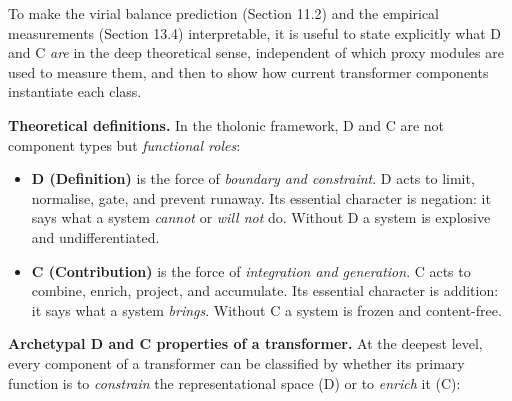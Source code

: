 \documentclass[12pt]{article}
\providecommand{\tightlist}{%
  \setlength{\itemsep}{0pt}\setlength{\parskip}{0pt}}
\begin{document}
To make the virial balance prediction (Section 11.2) and the empirical
measurements (Section 13.4) interpretable, it is useful to state
explicitly what D and C \emph{are} in the deep theoretical sense,
independent of which proxy modules are used to measure them, and then to
show how current transformer components instantiate each class.

\textbf{Theoretical definitions.} In the tholonic framework, D and C are
not component types but \emph{functional roles}:

\begin{itemize}
\tightlist
\item
  \textbf{D (Definition)} is the force of \emph{boundary and
  constraint}. D acts to limit, normalise, gate, and prevent runaway.
  Its essential character is negation: it says what a system
  \emph{cannot} or \emph{will not} do. Without D a system is explosive
  and undifferentiated.
\item
  \textbf{C (Contribution)} is the force of \emph{integration and
  generation}. C acts to combine, enrich, project, and accumulate. Its
  essential character is addition: it says what a system \emph{brings}.
  Without C a system is frozen and content-free.
\end{itemize}

\textbf{Archetypal D and C properties of a transformer.} At the deepest
level, every component of a transformer can be classified by whether its
primary function is to \emph{constrain} the representational space (D)
or to \emph{enrich} it (C):
\end{document}
